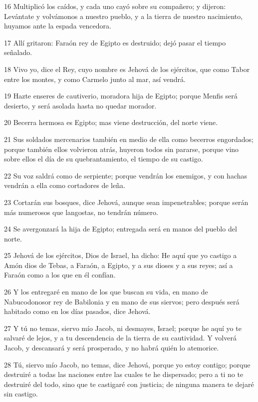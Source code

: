 \par 16 Multiplicó los caídos, y cada uno cayó sobre su compañero; y dijeron: Levántate y volvámonos a nuestro pueblo, y a la tierra de nuestro nacimiento, huyamos ante la espada vencedora.
\par 17 Allí gritaron: Faraón rey de Egipto es destruido; dejó pasar el tiempo señalado.
\par 18 Vivo yo, dice el Rey, cuyo nombre es Jehová de los ejércitos, que como Tabor entre los montes, y como Carmelo junto al mar, así vendrá.
\par 19 Hazte enseres de cautiverio, moradora hija de Egipto; porque Menfis será desierto, y será asolada hasta no quedar morador.
\par 20 Becerra hermosa es Egipto; mas viene destrucción, del norte viene.
\par 21 Sus soldados mercenarios también en medio de ella como becerros engordados; porque también ellos volvieron atrás, huyeron todos sin pararse, porque vino sobre ellos el día de su quebrantamiento, el tiempo de su castigo.
\par 22 Su voz saldrá como de serpiente; porque vendrán los enemigos, y con hachas vendrán a ella como cortadores de leña.
\par 23 Cortarán sus bosques, dice Jehová, aunque sean impenetrables; porque serán más numerosos que langostas, no tendrán número.
\par 24 Se avergonzará la hija de Egipto; entregada será en manos del pueblo del norte.
\par 25 Jehová de los ejércitos, Dios de Israel, ha dicho: He aquí que yo castigo a Amón dios de Tebas, a Faraón, a Egipto, y a sus dioses y a sus reyes; así a Faraón como a los que en él confían.
\par 26 Y los entregaré en mano de los que buscan su vida, en mano de Nabucodonosor rey de Babilonia y en mano de sus siervos; pero después será habitado como en los días pasados, dice Jehová. 
\par 27 Y tú no temas, siervo mío Jacob, ni desmayes, Israel; porque he aquí yo te salvaré de lejos, y a tu descendencia de la tierra de su cautividad. Y volverá Jacob, y descansará y será prosperado, y no habrá quién lo atemorice.
\par 28 Tú, siervo mío Jacob, no temas, dice Jehová, porque yo estoy contigo; porque destruiré a todas las naciones entre las cuales te he dispersado; pero a ti no te destruiré del todo, sino que te castigaré con justicia; de ninguna manera te dejaré sin castigo. 

